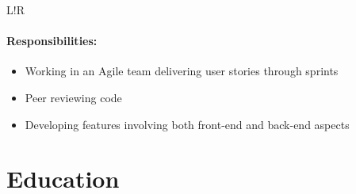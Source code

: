 \documentclass[10pt]{article}
\newcommand\VRule{\color{lightgray}\vrule width 0.5pt}
\begin{document}
\begin{longtable}{L!{\VRule}R}
\vspace{-3mm}
\paragraph{Responsibilities:}
\begin{itemize}[noitemsep,topsep=0pt]
    \item Working in an Agile team delivering user stories through sprints
    \item Peer reviewing code
    \item Developing features involving both front-end and back-end aspects
\end{itemize}
\end{longtable}

\section*{Education}
\end{document}
